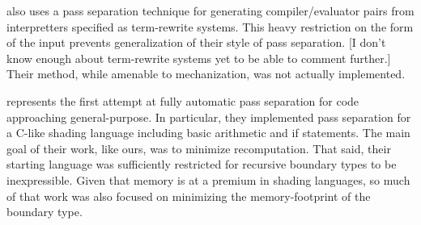 \documentclass{article}
\begin{document}
\cite{hannan94} also uses a pass separation technique for generating compiler/evaluator pairs from interpretters specified as term-rewrite systems.  This heavy restriction on the form of the input prevents generalization of their style of pass separation.  [I don't know enough about term-rewrite systems yet to be able to comment further.]  Their method, while amenable to mechanization, was not actually implemented.

\cite{knoblock} represents the first attempt at fully automatic pass separation for code approaching general-purpose.  In particular, they implemented pass separation for a C-like shading language including basic arithmetic and if statements.  The main goal of their work, like ours, was to minimize recomputation. That said, their starting language was sufficiently restricted for recursive boundary types to be inexpressible.  Given that memory is at a premium in shading languages, so much of that work was also focused on minimizing the memory-footprint of the boundary type.



\end{document}
